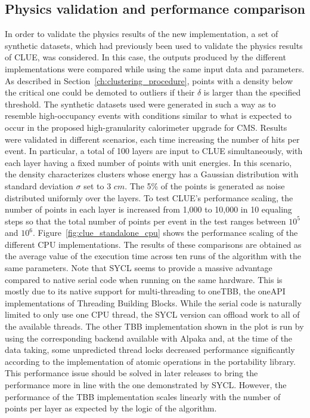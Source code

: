 \subsection{Physics validation and performance comparison}
In order to validate the physics results of the new implementation, a set of synthetic datasets, which had previously been used to validate the physics results of CLUE, was considered. In this case, the outputs produced by the different implementations were compared while using the same input data and parameters. As described in Section~\ref{ch:clustering_procedure}, points with a density below the critical one could be demoted to outliers if their $\delta$ is larger than the specified threshold. The synthetic datasets used were generated in such a way as to resemble high-occupancy events with conditions similar to what is expected to occur in the proposed high-granularity calorimeter upgrade for CMS. Results were validated in different scenarios, each time increasing the number of hits per event. In particular, a total of 100 layers are input to CLUE simultaneously, with each layer having a fixed number of points with unit energies. In this scenario, the density characterizes clusters whose energy has a Gaussian distribution with standard deviation $\sigma$ set to 3 $cm$. The 5\% of the points is generated as noise distributed uniformly over the layers. To test CLUE's performance scaling, the number of points in each layer is increased from 1,000 to 10,000 in 10 equaling steps so that the total number of points per event in the test ranges between $10^5$ and $10^6$. Figure~\ref{fig:clue_standalone_cpu} shows  the performance scaling of the different CPU implementations. The results of these comparisons are obtained as the average value of the execution time across ten runs of the algorithm with the same parameters. Note that SYCL seems to provide a massive advantage compared to native serial code when running on the same hardware. This is mostly due to its native support for multi-threading to oneTBB, the oneAPI implementations of Threading Building Blocks. While the serial code is naturally limited to only use one CPU thread, the SYCL version can offload work to all of the available threads. The other TBB implementation shown in the plot is run by using the corresponding backend available with Alpaka and, at the time of the data taking, some unpredicted thread locks decreased performance significantly according to the implementation of atomic operations in the portability library. This performance issue should be solved in later releases to bring the performance more in line with the one demonstrated by SYCL. However, the performance of the TBB implementation scales linearly with the number of points per layer as expected by the logic of the algorithm.

